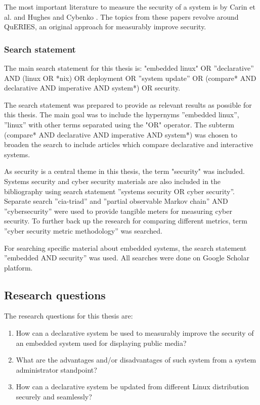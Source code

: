 The most important literature to measure the security of a system is
by Carin et al. and Hughes and Cybenko \cite{carin2008cybersecurity,
  hughes2013quantitative}. The topics from these papers revolve around
QuERIES, an original approach for measurably improve security. 

\subsubsection{Search statement} \label{searchstatement}

The main search statement for this thesis is: "embedded linux" OR
''declarative'' AND (linux OR *nix) OR deployment OR ''system update''
OR (compare* AND declarative AND imperative AND system*) OR security.

The search statement was prepared to provide as relevant results as
possible for this thesis. The main goal was to include the hypernyms
''embedded linux'', ''linux'' with other terms separated using the
"OR" operator. The subterm (compare* AND declarative AND imperative
AND system*) was chosen to broaden the search to include articles
which compare declarative and interactive systems.

As security is a central theme in this thesis, the term "security" was
included. Systems security
and cyber security materials are also included in the bibliography using
search statement ''systems security OR cyber security''. Separate search
''cia-triad'' and ''partial observable Markov chain'' AND
''cybersecurity'' were used to provide tangible meters for measuring
cyber security. To further back up the research for comparing
different metrics, term ''cyber security metric methodology'' was
searched.

For searching specific material about embedded systems, the search
statement ''embedded AND security'' was used. All searches were done on Google Scholar platform.

\subsection{Research questions} \label{resquest}

The research questions for this thesis are:

\begin{enumerate}
\item How can a declarative system be used to measurably improve the
  security of an embedded system used for displaying public media?
\item What are the advantages and/or disadvantages of such system from
  a system administrator standpoint?
\item How can a declarative system be updated from different Linux
  distribution securely and seamlessly?
\end{enumerate}


